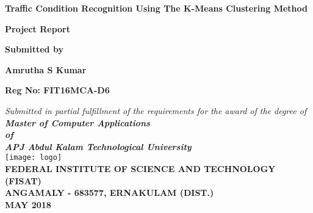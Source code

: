 \documentclass[12pt,report]{ucdavisthesis}
\begin{document}
    \thispagestyle{empty}
    \begin{center}
       
        \Large \textbf{Traffic Condition Recognition Using The
        	 K-Means Clustering Method}\\[0.6cm]
        \begin{center}
            \textbf{Project Report}
        \end{center}
        \begin{center}
            \small    \textbf{Submitted by}\\[0.5cm]
        \end{center}
       
        \begin{center}
           
           
            \large   \textbf{Amrutha S Kumar}\\[0.5cm]
        \end{center}
            \begin{center}
            \large  \textbf{Reg No: FIT16MCA-D6}\\[0.4cm]
        \end{center}
       
       
        \normalsize \textit{Submitted in partial fulfillment of the requirements for the award of the degree of}\\[0.3cm]
        \textit{\large \bfseries{Master of Computer Applications}\\
            \large \bfseries{of}\\
            \large \bfseries{APJ Abdul Kalam Technological University}\\[0.1cm]
        }
        \texttt{[image: logo]}\\[0.1cm]
        \normalsize \bfseries{FEDERAL INSTITUTE OF SCIENCE AND TECHNOLOGY (FISAT)}\\
        \small \bfseries{ANGAMALY - 683577, ERNAKULAM (DIST.)}\\
       
        \normalsize \bfseries{MAY 2018}\\
    \end{center}
    \newpage
   
   
   
\end{document}
